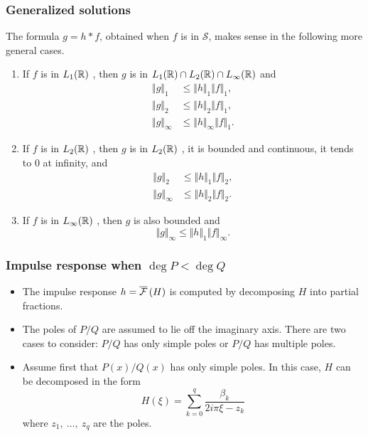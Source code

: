 \begin{frame}
\frametitle{Generalized solutions}
The formula $g=h*f$, obtained when $f$ is in $\mathcal{S}$, makes sense in the following more general cases.
\begin{enumerate}[label=(\roman*)]
\item If $f$ is in $L_1(\mathbb{R})$ , then $g$ is in $L_1(\mathbb{R})\cap L_2(\mathbb{R})\cap L_\infty(\mathbb{R})$  and
\begin{align*}
\Vert g\Vert_{1}\ &\leq\Vert h\Vert_{1}\Vert f\Vert_{1}, \\
\Vert g\Vert_{2}\ &\leq\Vert h\Vert_{2}\Vert f\Vert_{1}, \\
\Vert g\Vert_{\infty} &\leq\Vert h\Vert_{\infty}\Vert f\Vert_{1}.
\end{align*}
\item If $f$ is in $L_2(\mathbb{R})$ , then $g$ is in $L_2(\mathbb{R})$ , it is bounded and continuous, it tends to $0$ at infinity, and
\begin{align*}
\Vert g\Vert_{2}\ &\leq\Vert h\Vert_{1}\Vert f\Vert_{2}, \\
\Vert g\Vert_{\infty}& \leq \Vert h\Vert_{2}\Vert f\Vert_{2}.
\end{align*}
\item If $f$ is in $L_\infty(\mathbb{R})$ , then $g$ is also bounded and 
$$
\Vert g\Vert_{\infty}\leq\Vert h\Vert_{1}\Vert f\Vert_{\infty}.
$$
\end{enumerate}
\end{frame}

\begin{frame}
\frametitle{Impulse response when $\deg P<\deg Q$}
\begin{itemize}
\item The impulse response $h=\overline{\mathcal{F}}\left( H \right)$ is computed by decomposing $H$ into partial fractions. 
\item The poles of $P/Q$ are assumed to lie off the imaginary axis. There are two cases to consider: $P/Q$ has only simple poles or $P/Q$ has multiple poles.
\item Assume first that $P(x)/Q(x)$ has only simple poles. In this case, $H$ can be decomposed in the form
$$
H(\xi)=\sum_{k=0}^{q}\frac{\beta_{k}}{2i\pi\xi-z_{k}}
$$
where $z_{1},\ \ldots,\ z_{q}$ are the poles. 
\end{itemize}
\end{frame}

